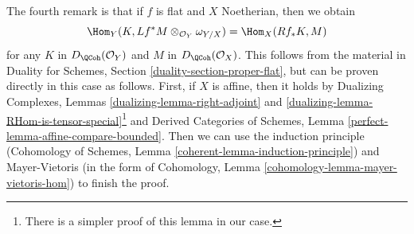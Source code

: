 \medskip\noindent
The fourth remark is that if $f$ is flat and $X$ Noetherian, then
we obtain
$$
\Hom_Y(K, Lf^*M \otimes_{\mathcal{O}_Y} \omega_{Y/X})
=
\Hom_X(Rf_*K, M)
$$
for any $K$ in $D_\QCoh(\mathcal{O}_Y)$ and $M$ in $D_\QCoh(\mathcal{O}_X)$.
This follows from the material in
Duality for Schemes, Section \ref{duality-section-proper-flat},
but can be proven directly in this case as follows.
First, if $X$ is affine, then it holds by
Dualizing Complexes, Lemmas \ref{dualizing-lemma-right-adjoint} and
\ref{dualizing-lemma-RHom-is-tensor-special}\footnote{There is a
simpler proof of this lemma in our case.} and
Derived Categories of Schemes, Lemma \ref{perfect-lemma-affine-compare-bounded}.
Then we can use the induction principle
(Cohomology of Schemes, Lemma \ref{coherent-lemma-induction-principle})
and Mayer-Vietoris
(in the form of Cohomology, Lemma \ref{cohomology-lemma-mayer-vietoris-hom})
to finish the proof.







